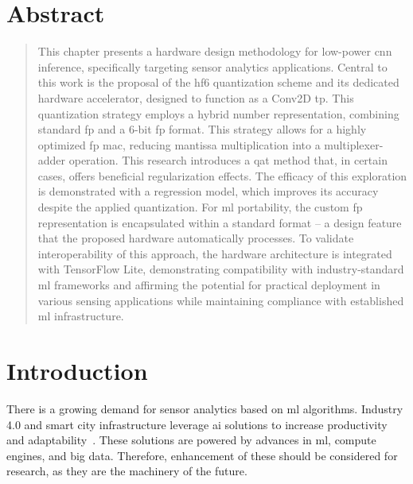 
\section*{Abstract}
\begin{quote}
This chapter presents a hardware design methodology for low-power \gls{cnn} inference, specifically targeting sensor analytics applications. Central to this work is the proposal of the \gls{hf6} quantization scheme and its dedicated hardware accelerator, designed to function as a Conv2D \gls{tp}. This quantization strategy employs a hybrid number representation, combining standard \gls{fp} and a 6-bit \gls{fp} format. This strategy allows for a highly optimized \gls{fp} \gls{mac}, reducing mantissa multiplication into a multiplexer-adder operation. This research introduces a \gls{qat} method that, in certain cases, offers beneficial regularization effects. The efficacy of this exploration is demonstrated with a regression model, which improves its accuracy despite the applied quantization. For \gls{ml} portability, the custom \gls{fp} representation is encapsulated within a standard format -- a design feature that the proposed hardware automatically processes. To validate interoperability of this approach, the hardware architecture is integrated with TensorFlow Lite, demonstrating compatibility with industry-standard \gls{ml} frameworks and affirming the potential for practical deployment in various sensing applications while maintaining compliance with established \gls{ml} infrastructure.

\end{quote}

\section{Introduction}
\label{sec:introduction}
There is a growing demand for sensor analytics based on \gls{ml} algorithms. Industry 4.0 and smart city infrastructure leverage \gls{ai} solutions to increase productivity and adaptability~\cite{lom2016industry}. These solutions are powered by advances in \gls{ml}, compute engines, and big data. Therefore, enhancement of these should be considered for research, as they are the machinery of the future.

